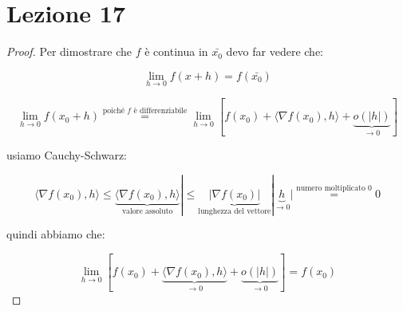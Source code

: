 \documentclass[../appunti-analisi.tex]{subfiles}
\begin{document}
\section{Lezione 17}



\begin{proof}
     Per dimostrare che $f$ è continua in $\bar{x_0} $ devo far vedere che:

     \[
         \lim_{ h \to 0 } f(x+h) = f( \bar{x_0} ) 
     \]

     \[
        \lim_{ h \to 0 } f(x_0 + h ) \overset{\text{poiché $f$ è differenziabile}}{=} \lim_{ h \to 0 } [f(x_0) + \langle \nabla f(x_0),h \rangle + \underbrace{o(|h|)}_\text{$\rightarrow 0$}]
     \]

     usiamo Cauchy-Schwarz:

     \[
        \langle \nabla f(x_0),h \rangle   \le  \underbrace{\langle \nabla f(x_0),h \rangle}_\text{valore assoluto}| \le  \underbrace{|\nabla f(x_0)|}_\text{lunghezza del vettore} | \underbrace{h}_\text{$\rightarrow 0$}| \overset{\text{numero moltiplicato $0$}}{=} 0
     \]

     quindi abbiamo che:

     \[
         \lim_{ h \to 0 } [f(x_0) + \underbrace{\langle \nabla f(x_0),h \rangle}_\text{$\rightarrow 0$} + \underbrace{o(|h|)}_\text{$\rightarrow 0$}] = f(x_0)
     \]
\end{proof}


\end{document}
